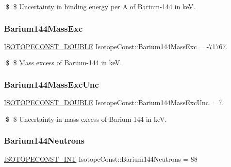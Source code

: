 \$ \$ Uncertainty in binding energy per A of Barium-\/144 in keV. \mbox{\label{group___isotope_const-_barium-_ba144_ga29edb62e5a83715ca1bac495ec85e873}} 
\subsubsection{\texorpdfstring{Barium144\+Mass\+Exc}{Barium144MassExc}}
{\footnotesize\ttfamily \mbox{\hyperlink{group___isotope_const-_macros_ga8f45a7272ce02c0b4c65c44636ed719a}{I\+S\+O\+T\+O\+P\+E\+C\+O\+N\+S\+T\+\_\+\+D\+O\+U\+B\+LE}} Isotope\+Const\+::\+Barium144\+Mass\+Exc = -\/71767.}

\$ \$ Mass excess of Barium-\/144 in keV. \mbox{\label{group___isotope_const-_barium-_ba144_gab4acd21312fbd1d5c806fe66f5272896}} 
\subsubsection{\texorpdfstring{Barium144\+Mass\+Exc\+Unc}{Barium144MassExcUnc}}
{\footnotesize\ttfamily \mbox{\hyperlink{group___isotope_const-_macros_ga8f45a7272ce02c0b4c65c44636ed719a}{I\+S\+O\+T\+O\+P\+E\+C\+O\+N\+S\+T\+\_\+\+D\+O\+U\+B\+LE}} Isotope\+Const\+::\+Barium144\+Mass\+Exc\+Unc = 7.}

\$ \$ Uncertainty in mass excess of Barium-\/144 in keV. \mbox{\label{group___isotope_const-_barium-_ba144_gafdf84912249ea6f9a51774cf7cc43d70}} 
\subsubsection{\texorpdfstring{Barium144\+Neutrons}{Barium144Neutrons}}
{\footnotesize\ttfamily \mbox{\hyperlink{group___isotope_const-_macros_ga5f18360b3e99483a35c32d789e62621c}{I\+S\+O\+T\+O\+P\+E\+C\+O\+N\+S\+T\+\_\+\+I\+NT}} Isotope\+Const\+::\+Barium144\+Neutrons = 88}

